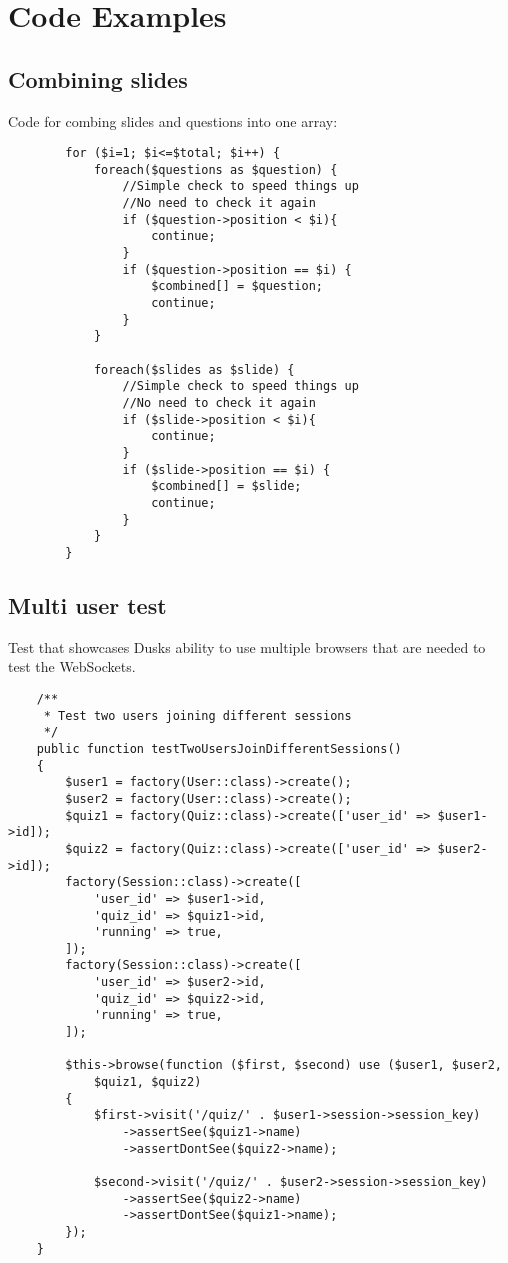 \chapter{Code Examples}
\label{appendix:code}
\section{Combining slides}
Code for combing slides and questions into one array:
\begin{verbatim}
        for ($i=1; $i<=$total; $i++) {
            foreach($questions as $question) {
                //Simple check to speed things up
                //No need to check it again
                if ($question->position < $i){
                    continue;
                }
                if ($question->position == $i) {
                    $combined[] = $question;
                    continue;
                }
            }

            foreach($slides as $slide) {
                //Simple check to speed things up
                //No need to check it again
                if ($slide->position < $i){
                    continue;
                }
                if ($slide->position == $i) {
                    $combined[] = $slide;
                    continue;
                }
            }
        }
\end{verbatim}
\newpage

\section{Multi user test}
Test that showcases Dusks ability to use multiple browsers that are needed to test the WebSockets.
\begin{verbatim}
    /**
     * Test two users joining different sessions
     */
    public function testTwoUsersJoinDifferentSessions()
    {
        $user1 = factory(User::class)->create();
        $user2 = factory(User::class)->create();
        $quiz1 = factory(Quiz::class)->create(['user_id' => $user1->id]);
        $quiz2 = factory(Quiz::class)->create(['user_id' => $user2->id]);
        factory(Session::class)->create([
            'user_id' => $user1->id,
            'quiz_id' => $quiz1->id,
            'running' => true,
        ]);
        factory(Session::class)->create([
            'user_id' => $user2->id,
            'quiz_id' => $quiz2->id,
            'running' => true,
        ]);
        
        $this->browse(function ($first, $second) use ($user1, $user2, 
        	$quiz1, $quiz2) 
        {
            $first->visit('/quiz/' . $user1->session->session_key)
                ->assertSee($quiz1->name)
                ->assertDontSee($quiz2->name);

            $second->visit('/quiz/' . $user2->session->session_key)
                ->assertSee($quiz2->name)
                ->assertDontSee($quiz1->name);
        });
    }
\end{verbatim}
\newpage

